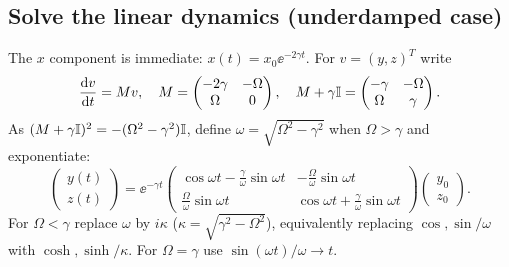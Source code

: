 \subsection{Solve the linear dynamics (underdamped case)}
The $x$ component is immediate: $x(t)=x_0\ee^{-2\gamma t}$. For $v=(y,z)^{T}$ write
\begin{equation}
\frac{\mathrm{d} v}{\mathrm{d} t}=Mv,\quad M=\begin{pmatrix}-2\gamma&-\Omega\\\Omega&0\end{pmatrix},\quad
M+\gamma\mathbb{I}=\begin{pmatrix}-\gamma&-\Omega\\\Omega&\gamma\end{pmatrix}.
\end{equation}
As $(M+\gamma\mathbb{I})^2=-(\Omega^2-\gamma^2)\mathbb{I}$, define $\omega=\sqrt{\Omega^2-\gamma^2}$ when $\Omega>\gamma$ and exponentiate:
\begin{equation}\label{eq:yzmatrix}
\boxed{\begin{pmatrix}y(t)\\z(t)\end{pmatrix}=\ee^{-\gamma t}
\begin{pmatrix}
\cos\omega t-\frac\gamma\omega\sin\omega t & -\frac\Omega\omega\sin\omega t\\[1mm]
\frac\Omega\omega\sin\omega t & \cos\omega t+\frac\gamma\omega\sin\omega t
\end{pmatrix}
\begin{pmatrix}y_0\\z_0\end{pmatrix}.}
\end{equation}
For $\Omega<\gamma$ replace $\omega$ by $i\kappa$ ($\kappa=\sqrt{\gamma^2-\Omega^2}$), equivalently replacing $\cos,\sin/\omega$ with $\cosh,\sinh/\kappa$. For $\Omega=\gamma$ use $\sin(\omega t)/\omega\to t$.

